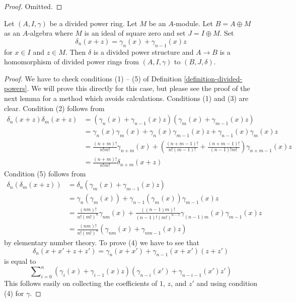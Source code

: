\begin{proof}
Omitted.
\end{proof}

\begin{lemma}
\label{lemma-divided-power-first-order-thickening}
Let $(A, I, \gamma)$ be a divided power ring. Let $M$ be an $A$-module.
Let $B = A \oplus M$ as an $A$-algebra where $M$ is an ideal of square zero
and set $J = I \oplus M$. Set
$$
\delta_n(x + z) = \gamma_n(x) + \gamma_{n - 1}(x)z
$$
for $x \in I$ and $z \in M$.
Then $\delta$ is a divided power structure and
$A \to B$ is a homomorphism of divided power rings from
$(A, I, \gamma)$ to $(B, J, \delta)$.
\end{lemma}

\begin{proof}
We have to check conditions (1) -- (5) of
Definition \ref{definition-divided-powers}.
We will prove this directly for this case, but please see the proof of
the next lemma for a method which avoids calculations.
Conditions (1) and (3) are clear. Condition (2) follows from
\begin{align*}
\delta_n(x + z)\delta_m(x + z)
& =
(\gamma_n(x) + \gamma_{n - 1}(x)z)(\gamma_m(x) + \gamma_{m - 1}(x)z) \\
& = \gamma_n(x)\gamma_m(x) + \gamma_n(x)\gamma_{m - 1}(x)z +
\gamma_{n - 1}(x)\gamma_m(x)z \\
& =
\frac{(n + m)!}{n!m!} \gamma_{n + m}(x) +
\left(\frac{(n + m - 1)!}{n!(m - 1)!} +
\frac{(n + m - 1)!}{(n - 1)!m!}\right)
\gamma_{n + m - 1}(x) z \\
& =
\frac{(n + m)!}{n!m!}\delta_{n + m}(x + z)
\end{align*}
Condition (5) follows from
\begin{align*}
\delta_n(\delta_m(x + z))
& =
\delta_n(\gamma_m(x) + \gamma_{m - 1}(x)z) \\
& =
\gamma_n(\gamma_m(x)) + \gamma_{n - 1}(\gamma_m(x))\gamma_{m - 1}(x)z \\
& =
\frac{(nm)!}{n! (m!)^n} \gamma_{nm}(x) +
\frac{((n - 1)m)!}{(n - 1)! (m!)^{n - 1}}
\gamma_{(n - 1)m}(x) \gamma_{m - 1}(x) z \\
& = \frac{(nm)!}{n! (m!)^n}(\gamma_{nm}(x) + \gamma_{nm - 1}(x) z)
\end{align*}
by elementary number theory. To prove (4) we have to see that
$$
\delta_n(x + x' + z + z')
=
\gamma_n(x + x') + \gamma_{n - 1}(x + x')(z + z')
$$
is equal to
$$
\sum\nolimits_{i = 0}^n
(\gamma_i(x) + \gamma_{i - 1}(x)z)
(\gamma_{n - i}(x') + \gamma_{n - i - 1}(x')z')
$$
This follows easily on collecting the coefficients of
$1$, $z$, and $z'$ and using condition (4) for $\gamma$.
\end{proof}

